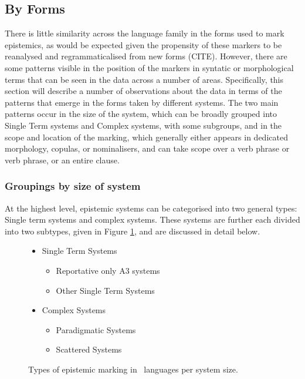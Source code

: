 \subsection{By Forms}\label{ss:Description:ClassBySystem}
There is little similarity across the language family in the forms used to mark epistemics, as would be expected given the propensity of these markers to be reanalysed and regrammaticalised from new forms (CITE). However, there are some patterns visible in the position of the markers in syntatic or morphological terms that can be seen in the data across a number of areas. Specifically, this section will describe a number of observations about the data in terms of the patterns that emerge in the forms taken by different systems. The two main patterns occur in the size of the system, which can be broadly grouped into Single Term systems and Complex systems, with some subgroups, and in the scope and location of the marking, which generally either appears in dedicated morphology, copulas, or nominalisers, and can take scope over a verb phrase or verb phrase, or an entire clause.
\subsubsection{Groupings by size of system}\label{sss:Description:GroupSize}
At the highest level, epistemic systems can be categorised into two general types: Single term systems and complex systems. These systems are further each divided into two subtypes, given in Figure \ref{f:Description:SizeTypes}, and are discussed in detail below.

\begin{figure}
        \begin{itemize}
                \item Single Term Systems
                \begin{itemize}
                        \item Reportative only A3 systems
                        \item Other Single Term Systems
                \end{itemize}
                \item Complex Systems
                \begin{itemize}
                        \item Paradigmatic Systems
                        \item Scattered Systems
                \end{itemize}
        \end{itemize}
        \caption{Types of epistemic marking in \lfam\ languages per system size.}\label{f:Description:SizeTypes}
\end{figure}

